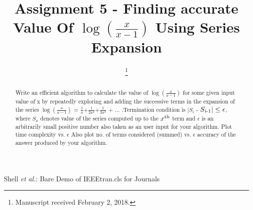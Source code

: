 \documentclass[conference]{IEEEtran}
\begin{document}
\title{Assignment 5 - Finding accurate Value Of $\log{\left(\frac{x}{x-1}\right)}$ Using Series Expansion}

\author{
\and
{}
\and
{}
\and
{}
\thanks{Manuscript received February 2, 2018.}}

{Shell \MakeLowercase{\textit{et al.}}: Bare Demo of IEEEtran.cls for Journals}

\maketitle

\IEEEpeerreviewmaketitle
\begin{abstract}
 Write an efficient algorithm to calculate the value of $\log{\left(\frac{x}{x-1}\right)}$ for some given input value of x by repeatedly exploring and adding the successive terms in the expansion of the series $\log{\left(\frac{x}{x-1}\right)}$ = $\frac{1}{x}$+$\frac{1}{2x^2}$+$\frac{1}{3x^3}$ + ... .Termination condition is $|S_{i}$ - $ S\textsubscript{i-1}| \leq \epsilon $, where $S_{x}$ denotes value of the series computed up to the $ x\textsuperscript{th}$ term and $\epsilon$ is an arbitrarily small positive number also taken as an user input for your algorithm. Plot time complexity vs. $\epsilon$ Also plot no. of terms considered (summed) vs. $\epsilon$ accuracy of the answer produced by your algorithm.
\end{abstract}
\end{document}
